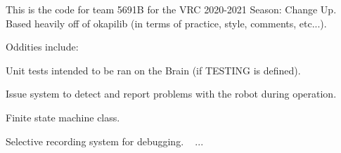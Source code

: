 This is the code for team 5691B for the V\+RC 2020-\/2021 Season\+: Change Up. ~\newline
 Based heavily off of okapilib (in terms of practice, style, comments, etc...). ~\newline


Oddities include\+: ~\newline

\begin{DoxyItemize}
\item Unit tests intended to be ran on the Brain (if T\+E\+S\+T\+I\+NG is defined). ~\newline

\item Issue system to detect and report problems with the robot during operation. ~\newline

\item Finite state machine class. ~\newline

\item Selective recording system for debugging. ~\newline
 ... 
\end{DoxyItemize}